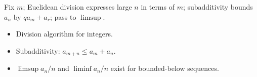 \begin{remark*}
Fix $m$; Euclidean division expresses large $n$ in terms of $m$; subadditivity bounds $a_n$ by $q a_m + a_r$; pass to $\limsup$.
\end{remark*}

\begin{remark*}[Dependencies]
\begin{itemize}
  \item Division algorithm for integers.
  \item Subadditivity: $a_{m+n} \le a_m + a_n$.
  \item $\limsup a_n/n$ and $\liminf a_n/n$ exist for bounded-below sequences.
\end{itemize}
\end{remark*}
